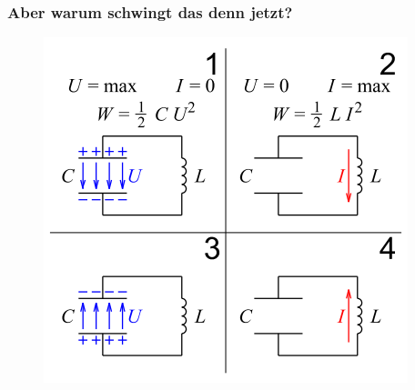 \begin{frame}
  \frametitle{Aber warum schwingt das denn jetzt?}
  \begin{center}
    \begin{figure}
      \includegraphics[width=.8\textwidth,height=.75\textheight,keepaspectratio]{e07/Schwingkreis.png}
    \end{figure}
  \end{center}
\end{frame}

